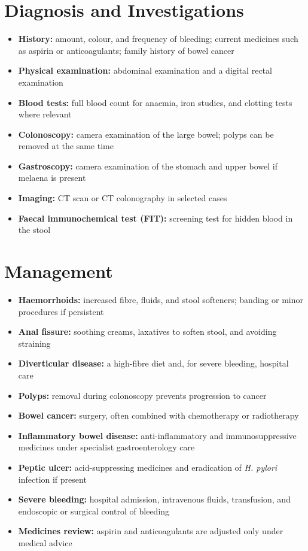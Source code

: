 \section*{Diagnosis and Investigations}
\begin{itemize}
    \item \textbf{History:} amount, colour, and frequency of bleeding; current medicines such as aspirin or anticoagulants; family history of bowel cancer
    \item \textbf{Physical examination:} abdominal examination and a digital rectal examination
    \item \textbf{Blood tests:} full blood count for anaemia, iron studies, and clotting tests where relevant
    \item \textbf{Colonoscopy:} camera examination of the large bowel; polyps can be removed at the same time
    \item \textbf{Gastroscopy:} camera examination of the stomach and upper bowel if melaena is present
    \item \textbf{Imaging:} CT scan or CT colonography in selected cases
    \item \textbf{Faecal immunochemical test (FIT):} screening test for hidden blood in the stool
\end{itemize}

\section*{Management}
\begin{itemize}
    \item \textbf{Haemorrhoids:} increased fibre, fluids, and stool softeners; banding or minor procedures if persistent
    \item \textbf{Anal fissure:} soothing creams, laxatives to soften stool, and avoiding straining
    \item \textbf{Diverticular disease:} a high-fibre diet and, for severe bleeding, hospital care
    \item \textbf{Polyps:} removal during colonoscopy prevents progression to cancer
    \item \textbf{Bowel cancer:} surgery, often combined with chemotherapy or radiotherapy
    \item \textbf{Inflammatory bowel disease:} anti-inflammatory and immunosuppressive medicines under specialist gastroenterology care
    \item \textbf{Peptic ulcer:} acid-suppressing medicines and eradication of \textit{H. pylori} infection if present
    \item \textbf{Severe bleeding:} hospital admission, intravenous fluids, transfusion, and endoscopic or surgical control of bleeding
    \item \textbf{Medicines review:} aspirin and anticoagulants are adjusted only under medical advice
\end{itemize}

